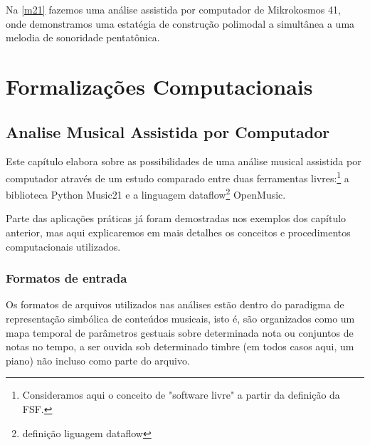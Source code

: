 \documentclass[
	12pt,				%
	openright,			%
	twoside,			%
	a4paper,			%
	english,			%
	french,				%
	spanish,			%
	brazil				%
	]{abntex2}
\begin{document}
Na \autoref{m21} fazemos uma análise assistida por computador de Mikrokosmos 41, onde demonstramos uma estatégia de construção polimodal a simultânea  a uma melodia de sonoridade pentatônica.

















%
%
%

\part{Formalizações Computacionais}


\chapter{Analise Musical Assistida por Computador}
\label{analise_computacional}

Este capítulo elabora sobre as possibilidades de uma análise musical assistida por computador através de um estudo comparado entre duas ferramentas livres:\footnote{Consideramos aqui o conceito de "software livre" a partir da definição da FSF.} a biblioteca Python Music21 e a linguagem dataflow\footnote{definição liguagem dataflow} OpenMusic.

Parte das aplicações práticas já foram demostradas nos exemplos dos capítulo anterior, mas aqui explicaremos em mais detalhes os conceitos e procedimentos computacionais utilizados.


\section{Formatos de entrada}


Os formatos de arquivos utilizados nas análises estão dentro do paradigma de representação simbólica de conteúdos musicais, isto é, são organizados como um mapa temporal de parâmetros gestuais sobre determinada nota ou conjuntos de notas no tempo, a ser ouvida sob determinado timbre (em todos casos aqui, um piano) não incluso como parte do arquivo. 
\end{document}
